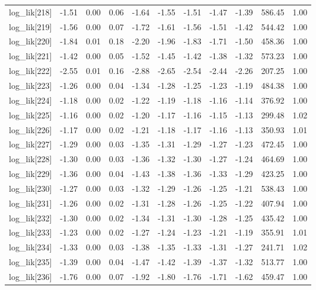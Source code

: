 \begin{table}[ht]
\begin{tabular}{rrrrrrrrrrr}
  log\_lik[218] & -1.51 & 0.00 & 0.06 & -1.64 & -1.55 & -1.51 & -1.47 & -1.39 & 586.45 & 1.00 \\ 
  log\_lik[219] & -1.56 & 0.00 & 0.07 & -1.72 & -1.61 & -1.56 & -1.51 & -1.42 & 544.42 & 1.00 \\ 
  log\_lik[220] & -1.84 & 0.01 & 0.18 & -2.20 & -1.96 & -1.83 & -1.71 & -1.50 & 458.36 & 1.00 \\ 
  log\_lik[221] & -1.42 & 0.00 & 0.05 & -1.52 & -1.45 & -1.42 & -1.38 & -1.32 & 573.23 & 1.00 \\ 
  log\_lik[222] & -2.55 & 0.01 & 0.16 & -2.88 & -2.65 & -2.54 & -2.44 & -2.26 & 207.25 & 1.00 \\ 
  log\_lik[223] & -1.26 & 0.00 & 0.04 & -1.34 & -1.28 & -1.25 & -1.23 & -1.19 & 484.38 & 1.00 \\ 
  log\_lik[224] & -1.18 & 0.00 & 0.02 & -1.22 & -1.19 & -1.18 & -1.16 & -1.14 & 376.92 & 1.00 \\ 
  log\_lik[225] & -1.16 & 0.00 & 0.02 & -1.20 & -1.17 & -1.16 & -1.15 & -1.13 & 299.48 & 1.02 \\ 
  log\_lik[226] & -1.17 & 0.00 & 0.02 & -1.21 & -1.18 & -1.17 & -1.16 & -1.13 & 350.93 & 1.01 \\ 
  log\_lik[227] & -1.29 & 0.00 & 0.03 & -1.35 & -1.31 & -1.29 & -1.27 & -1.23 & 472.45 & 1.00 \\ 
  log\_lik[228] & -1.30 & 0.00 & 0.03 & -1.36 & -1.32 & -1.30 & -1.27 & -1.24 & 464.69 & 1.00 \\ 
  log\_lik[229] & -1.36 & 0.00 & 0.04 & -1.43 & -1.38 & -1.36 & -1.33 & -1.29 & 423.25 & 1.00 \\ 
  log\_lik[230] & -1.27 & 0.00 & 0.03 & -1.32 & -1.29 & -1.26 & -1.25 & -1.21 & 538.43 & 1.00 \\ 
  log\_lik[231] & -1.26 & 0.00 & 0.02 & -1.31 & -1.28 & -1.26 & -1.25 & -1.22 & 407.94 & 1.00 \\ 
  log\_lik[232] & -1.30 & 0.00 & 0.02 & -1.34 & -1.31 & -1.30 & -1.28 & -1.25 & 435.42 & 1.00 \\ 
  log\_lik[233] & -1.23 & 0.00 & 0.02 & -1.27 & -1.24 & -1.23 & -1.21 & -1.19 & 355.91 & 1.01 \\ 
  log\_lik[234] & -1.33 & 0.00 & 0.03 & -1.38 & -1.35 & -1.33 & -1.31 & -1.27 & 241.71 & 1.02 \\ 
  log\_lik[235] & -1.39 & 0.00 & 0.04 & -1.47 & -1.42 & -1.39 & -1.37 & -1.32 & 513.77 & 1.00 \\ 
  log\_lik[236] & -1.76 & 0.00 & 0.07 & -1.92 & -1.80 & -1.76 & -1.71 & -1.62 & 459.47 & 1.00 \\ 

\end{tabular}
\end{table}
